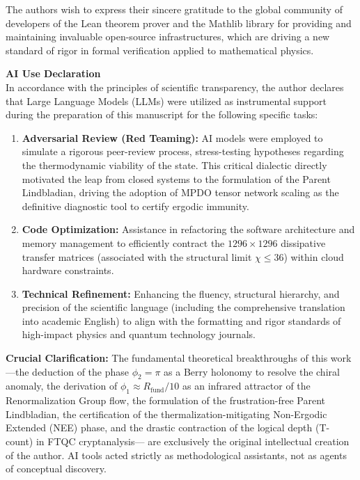 \documentclass[12pt,a4paper]{article}
\theoremstyle{plain}
\theoremstyle{definition}
\theoremstyle{remark}
\begin{document}
The authors wish to express their sincere gratitude to the global community of developers of the Lean theorem prover and the Mathlib library for providing and maintaining invaluable open-source infrastructures, which are driving a new standard of rigor in formal verification applied to mathematical physics.

\vspace{0.3cm}
\noindent \textbf{AI Use Declaration} \\
In accordance with the principles of scientific transparency, the author declares that Large Language Models (LLMs) were utilized as instrumental support during the preparation of this manuscript for the following specific tasks:

\begin{enumerate}
    \item \textbf{Adversarial Review (Red Teaming):} AI models were employed to simulate a rigorous peer-review process, stress-testing hypotheses regarding the thermodynamic viability of the state. This critical dialectic directly motivated the leap from closed systems to the formulation of the Parent Lindbladian, driving the adoption of MPDO tensor network scaling as the definitive diagnostic tool to certify ergodic immunity.
    \item \textbf{Code Optimization:} Assistance in refactoring the software architecture and memory management to efficiently contract the $1296 \times 1296$ dissipative transfer matrices (associated with the structural limit $\chi \le 36$) within cloud hardware constraints.
    \item \textbf{Technical Refinement:} Enhancing the fluency, structural hierarchy, and precision of the scientific language (including the comprehensive translation into academic English) to align with the formatting and rigor standards of high-impact physics and quantum technology journals.
\end{enumerate}

\textbf{Crucial Clarification:} The fundamental theoretical breakthroughs of this work —the deduction of the phase $\phi_2 = \pi$ as a Berry holonomy to resolve the chiral anomaly, the derivation of $\phi_1 \approx R_{\text{fund}}/10$ as an infrared attractor of the Renormalization Group flow, the formulation of the frustration-free Parent Lindbladian, the certification of the thermalization-mitigating Non-Ergodic Extended (NEE) phase, and the drastic contraction of the logical depth (T-count) in FTQC cryptanalysis— are exclusively the original intellectual creation of the author. AI tools acted strictly as methodological assistants, not as agents of conceptual discovery.
\end{document}
